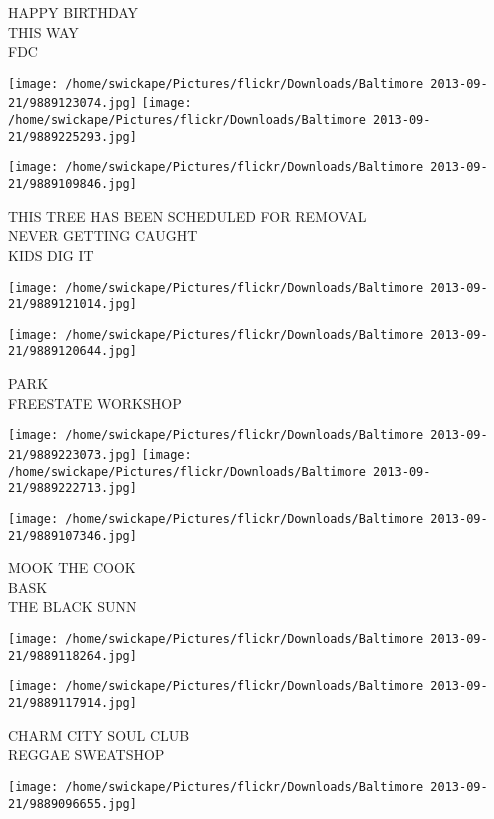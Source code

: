\documentclass[10pt,letterpaper]{article}
\begin{document}
HAPPY BIRTHDAY\\
THIS WAY\\
FDC\\
\pagebreak

\texttt{[image: /home/swickape/Pictures/flickr/Downloads/Baltimore 2013-09-21/9889123074.jpg]}
\texttt{[image: /home/swickape/Pictures/flickr/Downloads/Baltimore 2013-09-21/9889225293.jpg]}

\texttt{[image: /home/swickape/Pictures/flickr/Downloads/Baltimore 2013-09-21/9889109846.jpg]}

THIS TREE HAS BEEN SCHEDULED FOR REMOVAL\\
NEVER GETTING CAUGHT\\
KIDS DIG IT\\
\pagebreak

\texttt{[image: /home/swickape/Pictures/flickr/Downloads/Baltimore 2013-09-21/9889121014.jpg]}

\vspace{0.25in}
\texttt{[image: /home/swickape/Pictures/flickr/Downloads/Baltimore 2013-09-21/9889120644.jpg]}

PARK\\
FREESTATE WORKSHOP\\
\pagebreak

\texttt{[image: /home/swickape/Pictures/flickr/Downloads/Baltimore 2013-09-21/9889223073.jpg]}
\texttt{[image: /home/swickape/Pictures/flickr/Downloads/Baltimore 2013-09-21/9889222713.jpg]}

\texttt{[image: /home/swickape/Pictures/flickr/Downloads/Baltimore 2013-09-21/9889107346.jpg]}

MOOK THE COOK\\
BASK\\
THE BLACK SUNN\\
\pagebreak

\texttt{[image: /home/swickape/Pictures/flickr/Downloads/Baltimore 2013-09-21/9889118264.jpg]}

\vspace{0.25in}
\texttt{[image: /home/swickape/Pictures/flickr/Downloads/Baltimore 2013-09-21/9889117914.jpg]}

CHARM CITY SOUL CLUB\\
REGGAE SWEATSHOP\\
\pagebreak

\texttt{[image: /home/swickape/Pictures/flickr/Downloads/Baltimore 2013-09-21/9889096655.jpg]}
\end{document}
